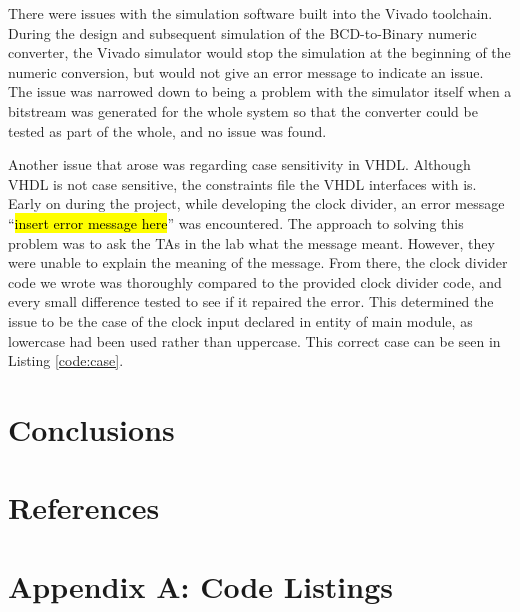 \documentclass[11pt]{article}
\begin{document}
There were issues with the simulation software built into the Vivado toolchain. During the design and subsequent simulation of the BCD-to-Binary numeric converter, the Vivado simulator would stop the simulation at the beginning of the numeric conversion, but would not give an error message to indicate an issue. The issue was narrowed down to being a problem with the simulator itself when a bitstream was generated for the whole system so that the converter could be tested as part of the whole, and no issue was found.

Another issue that arose was regarding case sensitivity in VHDL. Although VHDL is not case sensitive, the constraints file the VHDL interfaces with is. Early on during the project, while developing the clock divider, an error message ``\hl{insert error message here}'' was encountered. The approach to solving this problem was to ask the TAs in the lab what the message meant. However, they were unable to explain the meaning of the message. From there, the clock divider code we wrote was thoroughly compared to the provided clock divider code, and every small difference tested to see if it repaired the error. This determined the issue to be the case of the clock input declared in entity of main module, as lowercase had been used rather than uppercase. This correct case can be seen in Listing \ref{code:case}.

\section{Conclusions}


\newpage

\section{References}
\printbibliography

\newpage

\section{Appendix A: Code Listings}
\end{document}
